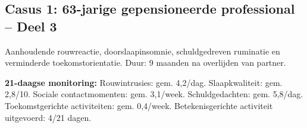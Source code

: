 \documentclass[11pt,a4paper]{article}
\begin{document}
\vspace{0.5em}

\newpage
\subsection*{Casus 1: 63-jarige gepensioneerde professional -- Deel 3}

\begin{complaintbox}[title={Casus 1: 63-jarige gepensioneerde professional}]
\small Aanhoudende rouwreactie, doorslaapinsomnie, schuldgedreven ruminatie en verminderde toekomstorientatie. Duur: 9 maanden na overlijden van partner.
\end{complaintbox}

\begin{monitorbox}
\small\textbf{21-daagse monitoring:} Rouwintrusies: gem. 4,2/dag. Slaapkwaliteit: gem. 2,8/10. Sociale contactmomenten: gem. 3,1/week. Schuldgedachten: gem. 5,8/dag. Toekomstgerichte activiteiten: gem. 0,4/week. Betekenisgerichte activiteit uitgevoerd: 4/21 dagen.
\end{monitorbox}
\end{document}
